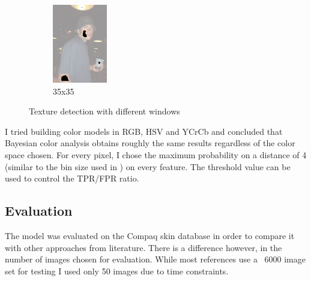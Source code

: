 \documentclass[12pt]{report}
\begin{document}
\begin{figure}[h!]
\begin{subfigure}[b]{0.3\linewidth}
			\includegraphics[width=\linewidth]{resources/texture_35_35.png}
			\caption{35x35}
		\end{subfigure}
		\caption{Texture detection with different windows}
		\label{fig:texture}
	\end{figure}
	
	I tried building color models in RGB, HSV and YCrCb and concluded that Bayesian color analysis obtains roughly the same results regardless of the color space chosen. For every pixel, I chose the maximum probability on a distance of 4 (similar to the bin size used in \cite{compaq}) on every feature. The threshold value can be used to control the TPR/FPR ratio.
	
	\subsection{Evaluation}
	The model was evaluated on the Compaq skin database in order to compare it with other approaches from literature. There is a difference however, in the number of images chosen for evaluation. While most references use a ~6000 image set for testing I used only 50 images due to time constraints.
	
\end{document}
